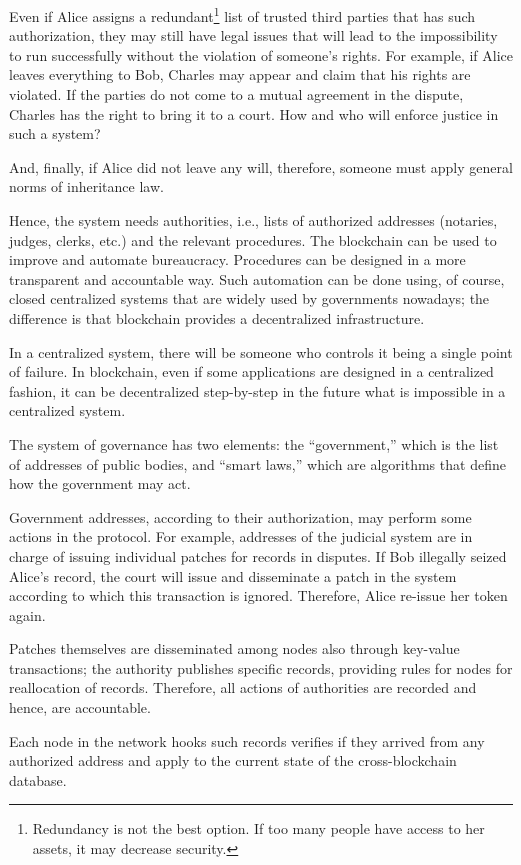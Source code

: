 \begin{multicols}{2}
Even if Alice assigns a redundant\footnote{Redundancy is not the best option. If too many people have access to her assets, it may decrease security.} list of trusted third parties that has such authorization, they may still have legal issues that will lead to the impossibility to run successfully without the violation of someone's rights. For example, if Alice leaves everything to Bob, Charles may appear and claim that his rights are violated. If the parties do not come to a mutual agreement in the dispute, Charles has the right to bring it to a court. How and who will enforce justice in such a system?

And, finally, if Alice did not leave any will, therefore, someone must apply general norms of inheritance law.

Hence, the system needs authorities, i.e., lists of authorized addresses (notaries, judges, clerks, etc.) and the relevant procedures. The blockchain can be used to improve and automate bureaucracy. Procedures can be designed in a more transparent and accountable way. Such automation can be done using, of course, closed centralized systems that are widely used by governments nowadays; the difference is that blockchain provides a decentralized infrastructure.

In a centralized system, there will be someone who controls it being a single point of failure. In blockchain, even if some applications are designed in a centralized fashion, it can be decentralized step-by-step in the future what is impossible in a centralized system.

The system of governance has two elements: the “government,” which is the list of addresses of public bodies, and “smart laws,” which are algorithms that define how the government may act.

Government addresses, according to their authorization, may perform some actions in the protocol. For example, addresses of the judicial system are in charge of issuing individual patches for records in disputes. If Bob illegally seized Alice’s record, the court will issue and disseminate a patch in the system according to which this transaction is ignored. Therefore, Alice re-issue her token again.

Patches themselves are disseminated among nodes also through key-value transactions; the authority publishes specific records, providing rules for nodes for reallocation of records. Therefore, all actions of authorities are recorded and hence, are accountable.

Each node in the network hooks such records verifies if they arrived from any authorized address and apply to the current state of the cross-blockchain database.


\end{multicols}
